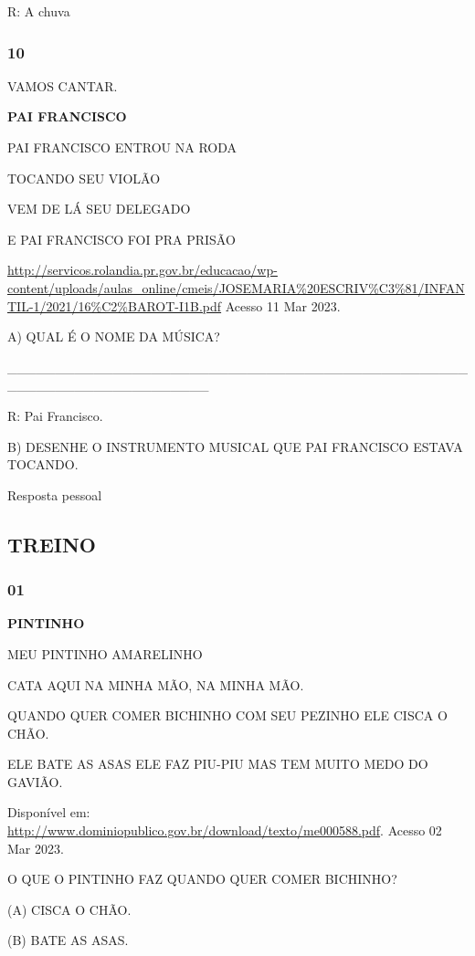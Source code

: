 R: A chuva

\subsubsection{10}\label{section-38}

VAMOS CANTAR.

\textbf{PAI FRANCISCO}

PAI FRANCISCO ENTROU NA RODA

TOCANDO SEU VIOLÃO

VEM DE LÁ SEU DELEGADO

E PAI FRANCISCO FOI PRA PRISÃO

\url{http://servicos.rolandia.pr.gov.br/educacao/wp-content/uploads/aulas_online/cmeis/JOSEMARIA\%20ESCRIV\%C3\%81/INFANTIL-1/2021/16\%C2\%BAROT-I1B.pdf}
Acesso 11 Mar 2023.

A) QUAL É O NOME DA MÚSICA?

\_\_\_\_\_\_\_\_\_\_\_\_\_\_\_\_\_\_\_\_\_\_\_\_\_\_\_\_\_\_\_\_\_\_\_\_\_\_\_\_\_\_\_\_\_\_\_\_\_\_\_\_\_\_\_\_\_\_\_\_\_\_\_\_\_\_\_\_\_

R: Pai Francisco.

B) DESENHE O INSTRUMENTO MUSICAL QUE PAI FRANCISCO ESTAVA TOCANDO.

Resposta pessoal

\subsection{TREINO}\label{treino-2}

\subsubsection{01}\label{section-39}

\textbf{PINTINHO}

MEU PINTINHO AMARELINHO

CATA AQUI NA MINHA MÃO, NA MINHA MÃO.

QUANDO QUER COMER BICHINHO COM SEU PEZINHO ELE CISCA O CHÃO.

ELE BATE AS ASAS ELE FAZ PIU-PIU MAS TEM MUITO MEDO DO GAVIÃO.

Disponível em:
\url{http://www.dominiopublico.gov.br/download/texto/me000588.pdf}.
Acesso 02 Mar 2023.

O QUE O PINTINHO FAZ QUANDO QUER COMER BICHINHO?

(A) CISCA O CHÃO.

(B) BATE AS ASAS.

